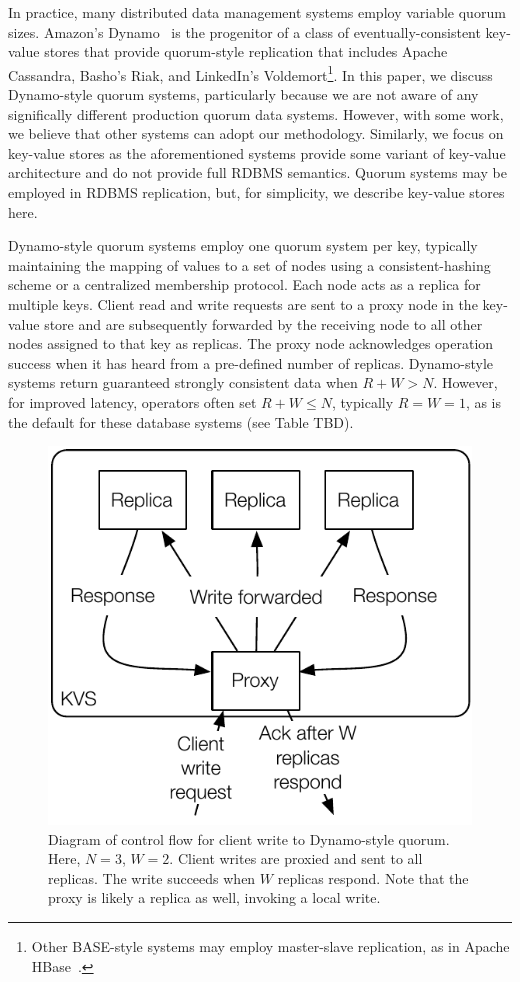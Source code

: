 \documentclass{vldb}
\begin{document}
In practice, many distributed data management systems employ variable
quorum sizes. Amazon's Dynamo~\cite{dynamo} is the progenitor of a
class of eventually-consistent key-value stores that provide
quorum-style replication that includes Apache Cassandra, Basho's Riak,
and LinkedIn's Voldemort\footnote{Other BASE-style systems may employ
  master-slave replication, as in Apache HBase~\cite{hbase}.}.  In
this paper, we discuss Dynamo-style quorum systems, particularly
because we are not aware of any significally different production
quorum data systems.  However, with some work, we believe that other
systems can adopt our methodology.  Similarly, we focus on key-value
stores as the aforementioned systems provide some variant of key-value
architecture and do not provide full RDBMS semantics.  Quorum systems
may be employed in RDBMS replication, but, for simplicity, we describe
key-value stores here.

Dynamo-style quorum systems employ one quorum system per key,
typically maintaining the mapping of values to a set of nodes using a
consistent-hashing scheme or a centralized membership protocol. Each
node acts as a replica for multiple keys.  Client read and write
requests are sent to a proxy node in the key-value store and are
subsequently forwarded by the receiving node to all other nodes
assigned to that key as replicas.  The proxy node acknowledges
operation success when it has heard from a pre-defined number of
replicas.  Dynamo-style systems return guaranteed strongly consistent
data when $R+W > N$.  However, for improved latency, operators often
set $R+W \leq N$, typically $R=W=1$, as is the default for these
database systems (see Table TBD).

\begin{figure}
\centering
\includegraphics[width=.8\columnwidth]{figs/dynamo-quorum.pdf}
\caption{Diagram of control flow for client write to Dynamo-style
  quorum.  Here, $N=3$, $W=2$. Client writes are proxied and sent to
  all replicas. The write succeeds when $W$ replicas respond.  Note
  that the proxy is likely a replica as well, invoking a local write.}
\label{fig:dynamo-quorum}
\end{figure}
\end{document}
